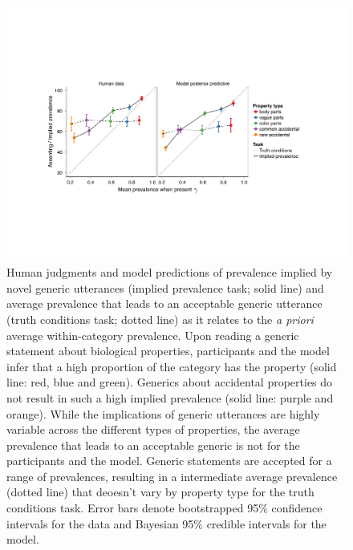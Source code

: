 \documentclass[10pt,letterpaper]{article}
\begin{document}
\begin{figure}
\centering
    \includegraphics[width=1\columnwidth]{asym-lines-data-model-2phi-2so-50kx3.pdf}
    \caption{Human judgments and model predictions of prevalence implied by novel generic utterances (implied prevalence task; solid line) and average prevalence that leads to an acceptable generic utterance (truth conditions task; dotted line) as it relates to the \emph{a priori} average within-category prevalence.
    Upon reading a generic statement about biological properties, participants and the model infer that a high proportion of the category has the property (solid line: red, blue and green). 
    Generics about accidental properties do not result in such a high implied prevalence (solid line: purple and orange).  
	While the implications of generic utterances are highly variable across the different types of properties, the average prevalence that leads to an acceptable generic is not for the participants and the model.
        Generic statements are accepted for a range of prevalences, resulting in a intermediate average prevalence (dotted line) that deoesn't vary by property type for the truth conditions task. 
    Error bars denote bootstrapped 95\% confidence intervals for the data and Bayesian 95\% credible intervals for the model.}
  \label{fig:exp2b}
\end{figure}
\end{document}
